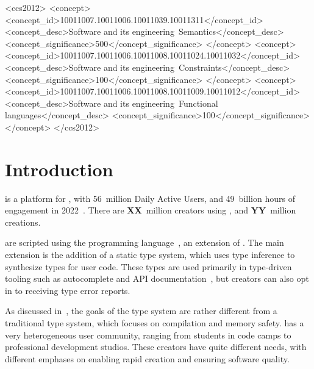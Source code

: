 \documentclass[
  acmsmall,
  review,
  anonymous,
]{acmart}
\begin{document}
\begin{CCSXML}
<ccs2012>
<concept>
<concept_id>10011007.10011006.10011039.10011311</concept_id>
<concept_desc>Software and its engineering~Semantics</concept_desc>
<concept_significance>500</concept_significance>
</concept>
<concept>
<concept_id>10011007.10011006.10011008.10011024.10011032</concept_id>
<concept_desc>Software and its engineering~Constraints</concept_desc>
<concept_significance>100</concept_significance>
</concept>
<concept>
<concept_id>10011007.10011006.10011008.10011009.10011012</concept_id>
<concept_desc>Software and its engineering~Functional languages</concept_desc>
<concept_significance>100</concept_significance>
</concept>
</ccs2012>
\end{CCSXML}



\maketitle

\section{Introduction}
\label{s:introduction}

 is a platform for ,
with 56~million Daily Active Users, and 49~billion hours of engagement in
2022~.
There are \textbf{XX}~million creators using ,
and \textbf{YY}~million creations.

 are scripted using the 
 programming language~,
an extension of .
The main extension is the addition of a static type system, which uses
type inference to synthesize types for user code. These types
are used primarily in type-driven tooling such as autocomplete
and API documentation~,
but creators can also opt in to receiving type error reports.

As discussed in~,
the goals of the  type system are rather different from
a traditional type system, which focuses on compilation and memory safety.
 has a very heterogeneous user community, ranging from
students in code camps to professional development studios. These
creators have quite different needs, with different emphases on
enabling rapid creation and ensuring software quality.
\end{document}
